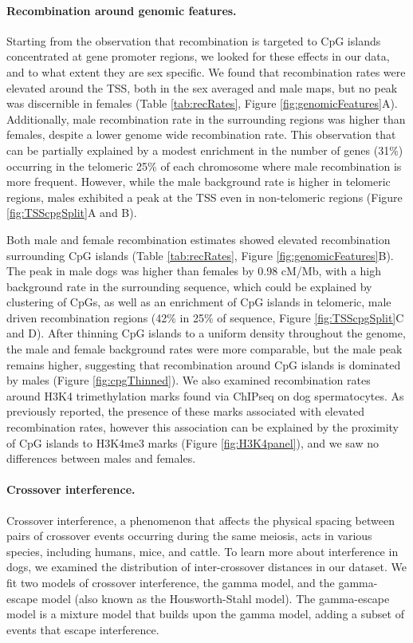 \paragraph{Recombination around genomic features.}

Starting from the observation that recombination is targeted to CpG islands concentrated at gene promoter regions\cite{Auton2013}, we looked for these effects in our data, and to what extent they are sex specific.
We found that recombination rates were elevated around the TSS, both in the sex averaged and male maps, but no peak was discernible in females (Table \ref{tab:recRates}, Figure \ref{fig:genomicFeatures}A).
Additionally, male recombination rate in the surrounding regions was higher than females, despite a lower genome wide recombination rate.
This observation that can be partially explained by a modest enrichment in the number of genes (31\%) occurring in the telomeric 25\% of each chromosome where male recombination is more frequent.
However, while the male background rate is higher in telomeric regions, males exhibited a peak at the TSS even in non-telomeric regions (Figure \ref{fig:TSScpgSplit}A and B).

Both male and female recombination estimates showed elevated recombination surrounding CpG islands (Table \ref{tab:recRates}, Figure \ref{fig:genomicFeatures}B).
The peak in male dogs was higher than females by 0.98 cM/Mb, with a high background rate in the surrounding sequence, which could be explained by
clustering of CpGs, as well as an enrichment of CpG islands in telomeric, male driven recombination regions (42\% in 25\% of sequence, Figure \ref{fig:TSScpgSplit}C and D).
After thinning CpG islands to a uniform density throughout the genome, the male and female background rates were more comparable, but the male peak remains higher, suggesting that recombination around CpG islands is dominated by males (Figure \ref{fig:cpgThinned}).
We also examined recombination rates around H3K4 trimethylation marks found via ChIPseq on dog spermatocytes\cite{Auton2013}.
As previously reported, the presence of these marks associated with elevated recombination rates, however this association can be explained by the proximity of CpG islands to H3K4me3 marks (Figure \ref{fig:H3K4panel}), and we saw no differences between males and females.

\paragraph{Crossover interference.}
Crossover interference, a phenomenon that affects the physical spacing between pairs of crossover events occurring during the same meiosis, acts in various species, including humans\cite{Campbell2015,Broman2000,Housworth2003}, mice\cite{Broman2002}, and cattle\cite{Sandor2012}.
To learn more about interference in dogs, we examined the distribution of inter-crossover distances in our dataset.
We fit two models of crossover interference, the gamma model\cite{Broman2000}, and the gamma-escape model\cite{Housworth2003} (also known as the Housworth-Stahl model).
The gamma-escape model is a mixture model that builds upon the gamma model, adding a subset of events that escape interference.

